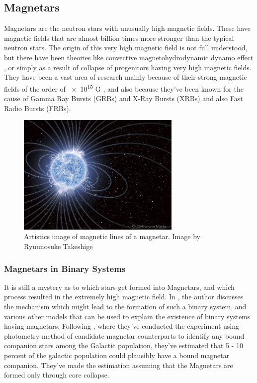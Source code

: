 
\subsection{Magnetars}

Magnetars are the neutron stars with unusually high magnetic fields. These have magnetic fields that are almost billion times more stronger than the typical neutron stars. The origin of this very high magnetic field is not full understood, but there have been theories like convective magnetohydrodynamic dynamo effect , or simply as a result of collapse of progenitors having very high magnetic fields. They have been a vast area of research mainly because of their strong magnetic fields of the order of \num{e15} G  , and also because they've been known for the cause of Gamma Ray Bursts (GRBs) and X-Ray Bursts (XRBs) and also Fast Radio Bursts (FRBs).\\

\begin{figure}
\centering
\includegraphics[height=0.5\textwidth, width=0.7\textwidth]{images/magnetar.png}
\caption{\small Artistics image of magnetic lines of a magnetar. Image by Ryuunosuke Takeshige}
\end{figure}

\subsubsection{Magnetars in Binary Systems}

It is still a mystery as to which stars get formed into Magnetars, and which process resulted in the extremely high magnetic field. In , the author discusses the mechanism which might lead to the formation of such a binary system, and various other models that can be used to explain the existence of binary systems having magnetars. Following , where they've conducted the experiment using photometry method of candidate magnetar counterparts to identify any bound companion stars among the Galactic population, they've estimated that 5 - 10 percent of the galactic population could plausibly have a bound magnetar companion. They've made the estimation assuming that the Magnetars are formed only through core collapse.

